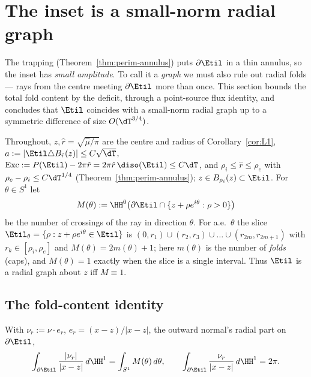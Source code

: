 \section{The inset is a small-norm radial graph}\label{sec:graph}

The trapping (Theorem~\ref{thm:perim-annulus}) puts $\partial\Etil$ in a
thin annulus, so the inset has \emph{small amplitude}. To call it a
\emph{graph} we must also rule out radial folds --- rays from the centre
meeting $\partial\Etil$ more than once. This section bounds the total fold
content by the deficit, through a point-source flux identity, and concludes
that $\Etil$ coincides with a small-norm radial graph up to a symmetric
difference of size $O(\dT^{3/4})$.

Throughout, $z,\hat r=\sqrt{\hat\mu/\pi}$ are the centre and radius of
Corollary~\ref{cor:L1}, $a:=|\Etil\triangle B_{\hat r}(z)|\le C\sqrt\dT$,
$\mathrm{Exc}:=P(\Etil)-2\pi\hat r=2\pi\hat r\,\diso(\Etil)\le C\dT$, and
$\rho_i\le\hat r\le\rho_e$ with $\rho_e-\rho_i\le C\dT^{1/4}$
(Theorem~\ref{thm:perim-annulus}); $z\in B_{\rho_i}(z)\subset\Etil$. For
$\theta\in S^1$ let
\[
   M(\theta):=\HH^0\bigl(\partial\Etil\cap\{z+\rho e^{i\theta}:\rho>0\}\bigr)
\]
be the number of crossings of the ray in direction $\theta$. For a.e.\
$\theta$ the slice $\Etil_\theta=\{\rho:z+\rho e^{i\theta}\in\Etil\}$ is
$(0,r_1)\cup(r_2,r_3)\cup\dots\cup(r_{2m},r_{2m+1})$ with $r_k\in[\rho_i,
\rho_e]$ and $M(\theta)=2m(\theta)+1$; here $m(\theta)$ is the number of
\emph{folds} (caps), and $M(\theta)=1$ exactly when the slice is a single
interval. Thus $\Etil$ is a radial graph about $z$ iff $M\equiv1$.

\subsection{The fold-content identity}

\begin{lemma}\label{lem:two-flux}
With $\nu_r:=\nu\cdot e_r$, $e_r=(x-z)/|x-z|$, the outward normal's radial
part on $\partial\Etil$,
\begin{equation}\label{eq:two-flux}
   \int_{\partial\Etil}\frac{|\nu_r|}{|x-z|}\,d\HH^1=\int_{S^1}M(\theta)\,d\theta,
   \qquad
   \int_{\partial\Etil}\frac{\nu_r}{|x-z|}\,d\HH^1=2\pi .
\end{equation}
\end{lemma}

